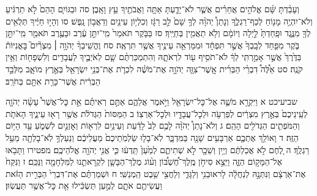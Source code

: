 \documentclass[twoside, openany, parskip=half, 11pt]{book}
\begin{document}
וְעָבַ֨דְתָּ שָּׁ֜ם אֱלֹהִ֣ים אֲחֵרִ֗ים אֲשֶׁ֧ר לֹא־יָדַ֛עְתָּ אַתָּ֥ה וַאֲבֹתֶ֖יךָ עֵ֥ץ וָאָֽבֶן׃ סה וּבַגּוֹיִ֤ם הָהֵם֙ לֹ֣א תַרְגִּ֔יעַ וְלֹא־יִהְיֶ֥ה מָנ֖וֹחַ לְכַף־רַגְלֶ֑ךָ וְנָתַן֩ יְהֹוָ֨ה לְךָ֥ שָׁם֙ לֵ֣ב רַגָּ֔ז וְכִלְי֥וֹן עֵינַ֖יִם וְדַאֲב֥וֹן נָֽפֶשׁ׃ סו וְהָי֣וּ חַיֶּ֔יךָ תְּלֻאִ֥ים לְךָ֖ מִנֶּ֑גֶד וּפָֽחַדְתָּ֙ לַ֣יְלָה וְיוֹמָ֔ם וְלֹ֥א תַאֲמִ֖ין בְּחַיֶּֽיךָ׃ סז בַּבֹּ֤קֶר תֹּאמַר֙ מִֽי־יִתֵּ֣ן עֶ֔רֶב וּבָעֶ֥רֶב תֹּאמַ֖ר מִֽי־יִתֵּ֣ן בֹּ֑קֶר מִפַּ֤חַד לְבָֽבְךָ֙ אֲשֶׁ֣ר תִּפְחָ֔ד וּמִמַּרְאֵ֥ה עֵינֶ֖יךָ אֲשֶׁ֥ר תִּרְאֶֽה׃ סח וֶהֱשִֽׁיבְךָ֨ יְהֹוָ֥ה ׀ מִצְרַ֘יִם֮ בׇּאֳנִיּוֹת֒ בַּדֶּ֙רֶךְ֙ אֲשֶׁ֣ר אָמַ֣רְתִּֽי לְךָ֔ לֹא־תֹסִ֥יף ע֖וֹד לִרְאֹתָ֑הּ וְהִתְמַכַּרְתֶּ֨ם שָׁ֧ם לְאֹיְבֶ֛יךָ לַעֲבָדִ֥ים וְלִשְׁפָח֖וֹת וְאֵ֥ין קֹנֶֽה׃
סט אֵ֩לֶּה֩ דִבְרֵ֨י הַבְּרִ֜ית אֲֽשֶׁר־צִוָּ֧ה יְהֹוָ֣ה אֶת־מֹשֶׁ֗ה לִכְרֹ֛ת אֶת־בְּנֵ֥י יִשְׂרָאֵ֖ל בְּאֶ֣רֶץ מוֹאָ֑ב מִלְּבַ֣ד הַבְּרִ֔ית אֲשֶׁר־כָּרַ֥ת אִתָּ֖ם בְּחֹרֵֽב׃

שביעיכט א וַיִּקְרָ֥א מֹשֶׁ֛ה אֶל־כׇּל־יִשְׂרָאֵ֖ל וַיֹּ֣אמֶר אֲלֵהֶ֑ם אַתֶּ֣ם רְאִיתֶ֗ם אֵ֣ת כׇּל־אֲשֶׁר֩ עָשָׂ֨ה יְהֹוָ֤ה לְעֵֽינֵיכֶם֙ בְּאֶ֣רֶץ מִצְרַ֔יִם לְפַרְעֹ֥ה וּלְכׇל־עֲבָדָ֖יו וּלְכׇל־אַרְצֽוֹ׃ ב הַמַּסּוֹת֙ הַגְּדֹלֹ֔ת אֲשֶׁ֥ר רָא֖וּ עֵינֶ֑יךָ הָאֹתֹ֧ת וְהַמֹּפְתִ֛ים הַגְּדֹלִ֖ים הָהֵֽם׃ ג וְלֹא־נָתַן֩ יְהֹוָ֨ה לָכֶ֥ם לֵב֙ לָדַ֔עַת וְעֵינַ֥יִם לִרְא֖וֹת וְאׇזְנַ֣יִם לִשְׁמֹ֑עַ עַ֖ד הַיּ֥וֹם הַזֶּֽה׃ ד וָאוֹלֵ֥ךְ אֶתְכֶ֛ם אַרְבָּעִ֥ים שָׁנָ֖ה בַּמִּדְבָּ֑ר לֹֽא־בָל֤וּ שַׂלְמֹֽתֵיכֶם֙ מֵעֲלֵיכֶ֔ם וְנַעַלְךָ֥ לֹֽא־בָלְתָ֖ה מֵעַ֥ל רַגְלֶֽךָ׃ ה לֶ֚חֶם לֹ֣א אֲכַלְתֶּ֔ם וְיַ֥יִן וְשֵׁכָ֖ר לֹ֣א שְׁתִיתֶ֑ם לְמַ֙עַן֙ תֵּֽדְע֔וּ כִּ֛י אֲנִ֥י יְהֹוָ֖ה אֱלֹהֵיכֶֽם׃ מפטירו וַתָּבֹ֖אוּ אֶל־הַמָּק֣וֹם הַזֶּ֑ה וַיֵּצֵ֣א סִיחֹ֣ן מֶֽלֶךְ־חֶ֠שְׁבּ֠וֹן וְע֨וֹג מֶלֶךְ־הַבָּשָׁ֧ן לִקְרָאתֵ֛נוּ לַמִּלְחָמָ֖ה וַנַּכֵּֽם׃ ז וַנִּקַּח֙ אֶת־אַרְצָ֔ם וַנִּתְּנָ֣הּ לְנַחֲלָ֔ה לָראוּבֵנִ֖י וְלַגָּדִ֑י וְלַחֲצִ֖י שֵׁ֥בֶט הַֽמְנַשִּֽׁי׃ ח וּשְׁמַרְתֶּ֗ם אֶת־דִּבְרֵי֙ הַבְּרִ֣ית הַזֹּ֔את וַעֲשִׂיתֶ֖ם אֹתָ֑ם לְמַ֣עַן תַּשְׂכִּ֔ילוּ אֵ֖ת כׇּל־אֲשֶׁ֥ר תַּעֲשֽׂוּן׃
\end{document}
